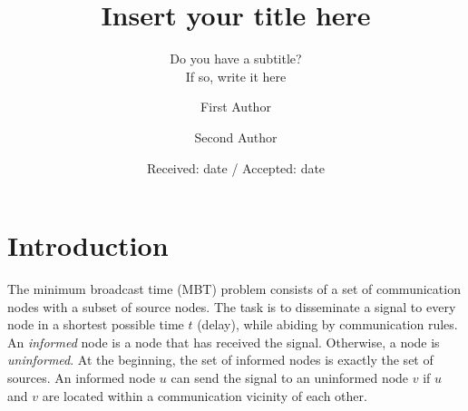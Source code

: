 \title{Insert your title here%
}
\subtitle{Do you have a subtitle?\\ If so, write it here}


\author{First Author         \and
        Second Author %
}



\date{Received: date / Accepted: date}


\maketitle

\begin{abstract}
\keywords{}
\end{abstract}

\section{Introduction}
\label{intro}
The minimum broadcast time (MBT) problem consists of a set of communication nodes with a subset of source nodes. 
The task is to disseminate a signal to every node in a shortest possible time $t$ (delay), while abiding by communication rules.
An \emph{informed} node is a node that has received the signal.
Otherwise, a node is \emph{uninformed}.
At the beginning, the set of informed nodes is exactly the set of sources.
An informed node $u$ can send the signal to an uninformed node $v$ if $u$ and $v$ are located within a communication vicinity of each other.

